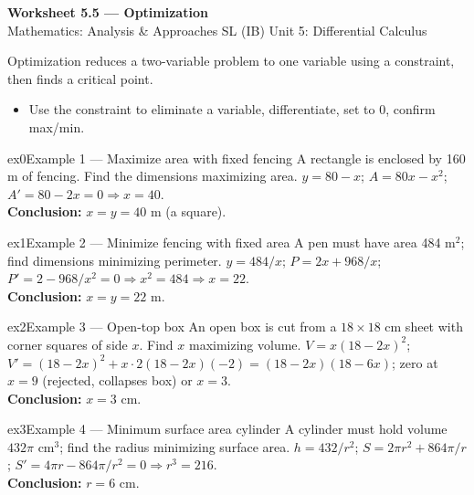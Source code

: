 \documentclass[11pt]{article}
\begin{document}
\begin{center}
{\LARGE\bfseries\color{titleblue}Worksheet 5.5 --- Optimization}\\[2pt]
{\small Mathematics: Analysis \& Approaches SL (IB) \textperiodcentered{} Unit 5: Differential Calculus}
\end{center}

\begin{ideabox}
Optimization reduces a two-variable problem to one variable using a constraint, then finds a critical point.
\begin{itemize}[leftmargin=*,itemsep=2pt]
  \item Use the constraint to eliminate a variable, differentiate, set to 0, confirm max/min.
\end{itemize}
\end{ideabox}


\begin{example}{ex0}{Example 1 --- Maximize area with fixed fencing}
A rectangle is enclosed by 160 m of fencing. Find the dimensions maximizing area.\soln
$y=80-x$; $A=80x-x^2$; $A'=80-2x=0\Rightarrow x=40$.\\[3pt]\textbf{Conclusion:} $x=y=40$ m (a square).
\end{example}

\begin{example}{ex1}{Example 2 --- Minimize fencing with fixed area}
A pen must have area 484 m$^2$; find dimensions minimizing perimeter.\soln
$y=484/x$; $P=2x+968/x$; $P'=2-968/x^2=0\Rightarrow x^2=484\Rightarrow x=22$.\\[3pt]\textbf{Conclusion:} $x=y=22$ m.
\end{example}

\begin{example}{ex2}{Example 3 --- Open-top box}
An open box is cut from a $18\times18$ cm sheet with corner squares of side $x$. Find $x$ maximizing volume.\soln
$V=x(18-2x)^2$; $V'=(18-2x)^2+x\cdot2(18-2x)(-2)=(18-2x)(18-6x)$; zero at $x=9$ (rejected, collapses box) or $x=3$.\\[3pt]\textbf{Conclusion:} $x=3$ cm.
\end{example}

\begin{example}{ex3}{Example 4 --- Minimum surface area cylinder}
A cylinder must hold volume $432\pi$ cm$^3$; find the radius minimizing surface area.\soln
$h=432/r^2$; $S=2\pi r^2+864\pi/r$; $S'=4\pi r-864\pi/r^2=0\Rightarrow r^3=216$.\\[3pt]\textbf{Conclusion:} $r=6$ cm.
\end{example}
\end{document}
